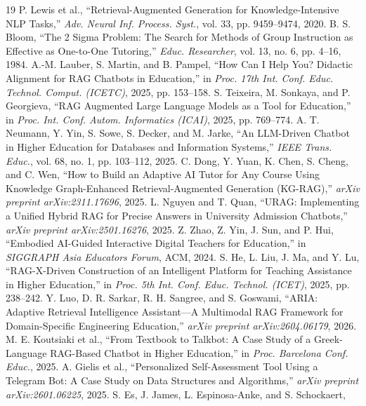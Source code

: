 \documentclass[conference]{IEEEtran}
\begin{document}
\begin{thebibliography}{19}
P. Lewis et al., ``Retrieval-Augmented Generation for Knowledge-Intensive
NLP Tasks,'' \textit{Adv. Neural Inf. Process. Syst.}, vol. 33,
pp. 9459--9474, 2020.
B. S. Bloom, ``The 2 Sigma Problem: The Search for Methods of Group
Instruction as Effective as One-to-One Tutoring,'' \textit{Educ.
Researcher}, vol. 13, no. 6, pp. 4--16, 1984.
A.-M. Lauber, S. Martin, and B. Pampel, ``How Can I Help You? Didactic
Alignment for RAG Chatbots in Education,'' in \textit{Proc. 17th Int.
Conf. Educ. Technol. Comput. (ICETC)}, 2025, pp. 153--158.
S. Teixeira, M. Sonkaya, and P. Georgieva, ``RAG Augmented Large
Language Models as a Tool for Education,'' in \textit{Proc. Int. Conf.
Autom. Informatics (ICAI)}, 2025, pp. 769--774.
A. T. Neumann, Y. Yin, S. Sowe, S. Decker, and M. Jarke,
``An LLM-Driven Chatbot in Higher Education for Databases and
Information Systems,'' \textit{IEEE Trans. Educ.}, vol. 68, no. 1,
pp. 103--112, 2025.
C. Dong, Y. Yuan, K. Chen, S. Cheng, and C. Wen, ``How to Build an
Adaptive AI Tutor for Any Course Using Knowledge Graph-Enhanced
Retrieval-Augmented Generation (KG-RAG),''
\textit{arXiv preprint arXiv:2311.17696}, 2025.
L. Nguyen and T. Quan, ``URAG: Implementing a Unified Hybrid RAG for
Precise Answers in University Admission Chatbots,''
\textit{arXiv preprint arXiv:2501.16276}, 2025.
Z. Zhao, Z. Yin, J. Sun, and P. Hui, ``Embodied AI-Guided Interactive
Digital Teachers for Education,'' in \textit{SIGGRAPH Asia Educators
Forum}, ACM, 2024.
S. He, L. Liu, J. Ma, and Y. Lu, ``RAG-X-Driven Construction of an
Intelligent Platform for Teaching Assistance in Higher Education,''
in \textit{Proc. 5th Int. Conf. Educ. Technol. (ICET)}, 2025,
pp. 238--242.
Y. Luo, D. R. Sarkar, R. H. Sangree, and S. Goswami,
``ARIA: Adaptive Retrieval Intelligence Assistant---A Multimodal RAG
Framework for Domain-Specific Engineering Education,''
\textit{arXiv preprint arXiv:2604.06179}, 2026.
M. E. Koutsiaki et al., ``From Textbook to Talkbot: A Case Study of a
Greek-Language RAG-Based Chatbot in Higher Education,'' in
\textit{Proc. Barcelona Conf. Educ.}, 2025.
A. Gielis et al., ``Personalized Self-Assessment Tool Using a Telegram
Bot: A Case Study on Data Structures and Algorithms,''
\textit{arXiv preprint arXiv:2601.06225}, 2025.
S. Es, J. James, L. Espinosa-Anke, and S. Schockaert,

\end{thebibliography}
\end{document}

